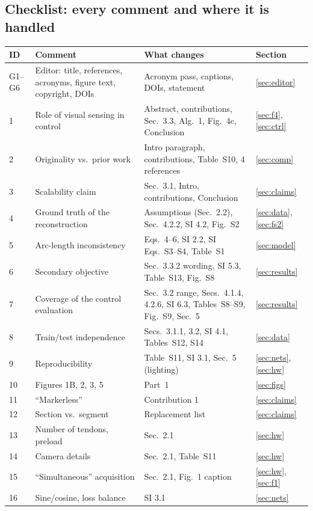 \documentclass[10pt,a4paper]{article}
\begin{document}
\subsection*{Checklist: every comment and where it is handled}
\small
\begin{longtable}{p{1.0cm}p{5.6cm}p{8.4cm}p{1.2cm}}
\toprule
ID & Comment & What changes & Section\\\midrule\endhead
G1--G6 & Editor: title, references, acronyms, figure text, copyright, DOIs & Acronym pass, captions, DOIs, statement & \ref{sec:editor}\\\midrule
1 & Role of visual sensing in control & Abstract, contributions, Sec.~3.3, Alg.~1, Fig.~4c, Conclusion & \ref{sec:f4}, \ref{sec:ctrl}\\
2 & Originality vs.\ prior work & Intro paragraph, contributions, Table~S10, 4 references & \ref{sec:comp}\\
3 & Scalability claim & Sec.~3.1, Intro, contributions, Conclusion & \ref{sec:claims}\\
4 & Ground truth of the reconstruction & Assumptions (Sec.~2.2), Sec.~4.2.2, SI 4.2, Fig.~S2 & \ref{sec:data}, \ref{sec:fs2}\\
5 & Arc-length inconsistency & Eqs.~4--6, SI 2.2, SI Eqs.~S3--S4, Table~S1 & \ref{sec:model}\\
6 & Secondary objective & Sec.~3.3.2 wording, SI 5.3, Table~S13, Fig.~S8 & \ref{sec:results}\\
7 & Coverage of the control evaluation & Sec.~3.2 range, Secs.~4.1.4, 4.2.6, SI 6.3, Tables~S8--S9, Fig.~S9, Sec.~5 & \ref{sec:results}\\
8 & Train/test independence & Secs.~3.1.1, 3.2, SI 4.1, Tables~S12, S14 & \ref{sec:data}\\
9 & Reproducibility & Table~S11, SI 3.1, Sec.~5 (lighting) & \ref{sec:nets}, \ref{sec:hw}\\
10 & Figures 1B, 2, 3, 5 & Part~1 & \ref{sec:figs}\\\midrule
11 & ``Markerless'' & Contribution 1 & \ref{sec:claims}\\
12 & Section vs.\ segment & Replacement list & \ref{sec:claims}\\
13 & Number of tendons, preload & Sec.~2.1 & \ref{sec:hw}\\
14 & Camera details & Sec.~2.1, Table~S11 & \ref{sec:hw}\\
15 & ``Simultaneous'' acquisition & Sec.~2.1, Fig.~1 caption & \ref{sec:hw}, \ref{sec:f1}\\
16 & Sine/cosine, loss balance & SI 3.1 & \ref{sec:nets}\\

\end{longtable}
\end{document}

